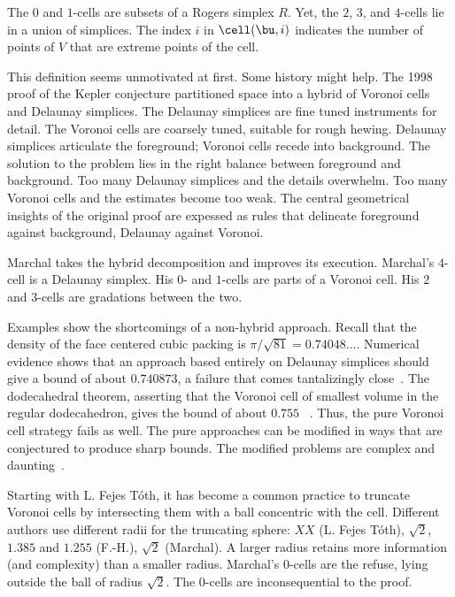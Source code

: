 The $0$ and $1$-cells are  subsets of a Rogers  simplex
$R$.  Yet, the $2$, $3$, and $4$-cells lie in a union of
simplices.  The index $i$ in  $\cell(\bu,i)$ indicates the number
of points of $V$ that are extreme points of the cell. 

This definition seems unmotivated at first.  Some history might help.
The 1998 proof of the Kepler conjecture partitioned space into a
hybrid of Voronoi cells and Delaunay simplices.  The Delaunay
simplices are fine tuned instruments for detail.  The Voronoi cells
are coarsely tuned, suitable for rough hewing.  Delaunay simplices
articulate the foreground; Voronoi cells recede into background.  The
solution to the problem lies in the right balance between foreground
and background.  Too many Delaunay simplices and the details
overwhelm.  Too many Voronoi cells and the estimates become too weak.
The central geometrical insights of the original proof are expessed as
rules that delineate foreground against background, Delaunay against
Voronoi.

Marchal takes the  hybrid decomposition and improves its
execution.  Marchal's $4$-cell is a Delaunay simplex.  His $0$- and
$1$-cells are parts of a Voronoi cell.  His $2$ and $3$-cells are
gradations between the two.

Examples show the shortcomings of a non-hybrid approach.
Recall that the density of the face centered cubic packing is
$\pi/\sqrt{81}=0.74048\ldots$.  Numerical evidence shows that an
approach based entirely on Delaunay simplices should give a bound of
about $0.740873$, a failure that comes tantalizingly
close~\cite{unknown}.  The dodecahedral theorem, asserting that the
Voronoi cell of smallest volume in the regular dodecahedron, gives the
bound of about $0.755$ ~\cite{unknown}.  Thus, the pure Voronoi cell
strategy fails as well.  The pure approaches can be modified in ways
that are conjectured to produce sharp bounds. The modified problems
are complex and daunting~\cite{unknown}.

Starting with L. Fejes T\'oth, it has become a common practice to
truncate Voronoi cells by intersecting them with a ball concentric
with the cell.  Different authors use different radii for the
truncating sphere: $XX$ (L. Fejes T\'oth), $\sqrt2$, $1.385$ and
$1.255$ (F.-H.), $\sqrt2$ (Marchal).  A larger radius retains more
information (and complexity) than a smaller radius.  Marchal's
$0$-cells are the refuse, lying outside the ball of radius $\sqrt2$.
The $0$-cells are inconsequential to the proof.


